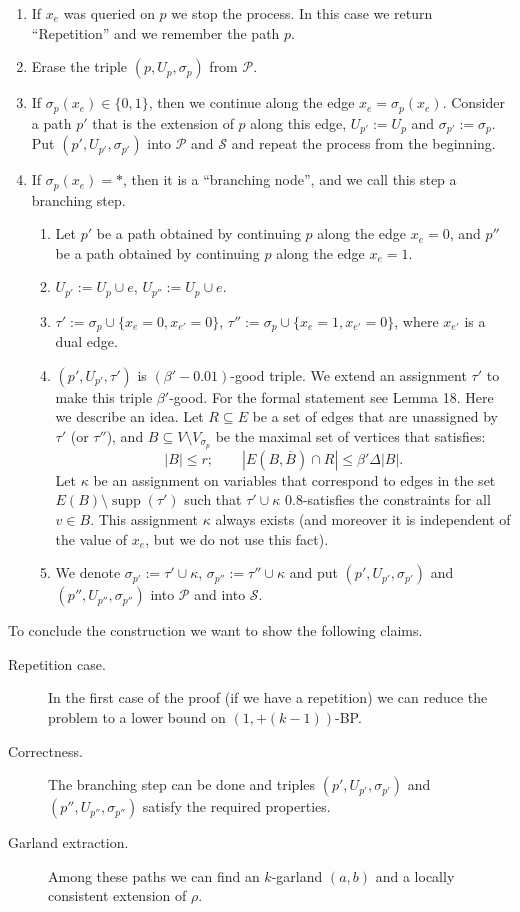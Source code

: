 \documentclass[10pt,a4paper]{article}
\newcommand{\supp}{\operatorname{supp}}
\begin{document}
\begin{enumerate}
\item If $x_e$ was queried on $p$ we stop the process. In this case we return ``Repetition'' and we remember the path $p$.
\item Erase the triple $(p,U_p,\sigma_p)$ from $\mathcal P$.
\item If $\sigma_p(x_e)\in\{0,1\}$, then we continue along the edge $x_e=\sigma_p(x_e)$. Consider a path $p'$ that is the extension of $p$ along this edge, $U_{p'}:=U_p$ and $\sigma_{p'}:=\sigma_p$. Put $(p',U_{p'},\sigma_{p'})$ into $\mathcal P$ and $\mathcal S$ and repeat the process from the beginning.
\item If $\sigma_p(x_e)=*$, then it is a ``branching node'', and we call this step a branching step.
\begin{enumerate}[label=\alph*.]
\item Let $p'$ be a path obtained by continuing $p$ along the edge $x_e=0$, and $p''$ be a path obtained by continuing $p$ along the edge $x_e=1$.
\item $U_{p'}:=U_p\cup e$, $U_{p''}:=U_p\cup e$.
\item $\tau':=\sigma_p\cup\{x_e=0,x_{e'}=0\}$, $\tau'':=\sigma_p\cup\{x_e=1,x_{e'}=0\}$, where $x_{e'}$ is a dual edge.
\item $(p',U_{p'},\tau')$ is $(\beta'-0.01)$-good triple. We extend an assignment $\tau'$ to make this triple $\beta'$-good. For the formal statement see Lemma 18. Here we describe an idea. Let $R\subseteq E$ be a set of edges that are unassigned by $\tau'$ (or $\tau''$), and $B\subseteq V\setminus V_{\sigma_p}$ be the maximal set of vertices that satisfies:
\[|B|\le r;\qquad |E(B,\overline B)\cap R|\le\beta'\Delta|B|.\]
Let $\kappa$ be an assignment on variables that correspond to edges in the set $E(B)\setminus\supp(\tau')$ such that $\tau'\cup\kappa$ $0.8$-satisfies the constraints for all $v\in B$. This assignment $\kappa$ always exists (and moreover it is independent of the value of $x_e$, but we do not use this fact).
\item We denote $\sigma_{p'}:=\tau'\cup\kappa$, $\sigma_{p''}:=\tau''\cup\kappa$ and put $(p',U_{p'},\sigma_{p'})$ and $(p'',U_{p''},\sigma_{p''})$ into $\mathcal P$ and into $\mathcal S$.
\end{enumerate}\end{enumerate}
To conclude the construction we want to show the following claims.
\begin{description}
\item[Repetition case.] In the first case of the proof (if we have a repetition) we can reduce the problem to a lower bound on $(1,+(k-1))$-BP.
\item[Correctness.] The branching step can be done and triples $(p',U_{p'},\sigma_{p'})$ and $(p'',U_{p''},\sigma_{p''})$ satisfy the required properties.
\item[Garland extraction.] Among these paths we can find an $k$-garland $(a,b)$ and a locally consistent extension of $\rho$.
\end{description}
\end{document}
